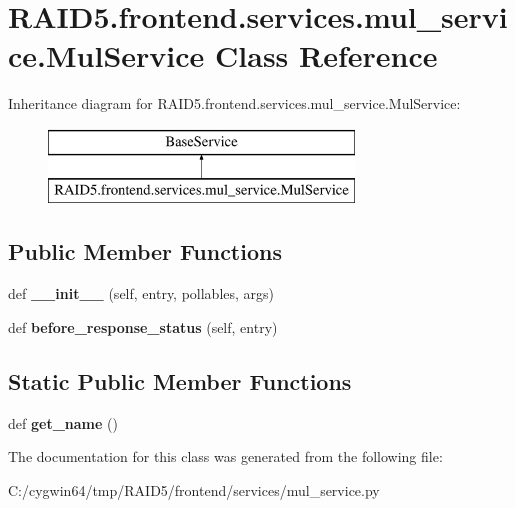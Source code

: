 \hypertarget{class_r_a_i_d5_1_1frontend_1_1services_1_1mul__service_1_1_mul_service}{}\section{R\+A\+I\+D5.\+frontend.\+services.\+mul\+\_\+service.\+Mul\+Service Class Reference}
\label{class_r_a_i_d5_1_1frontend_1_1services_1_1mul__service_1_1_mul_service}
Inheritance diagram for R\+A\+I\+D5.\+frontend.\+services.\+mul\+\_\+service.\+Mul\+Service\+:\begin{figure}[H]
\begin{center}
\leavevmode
\includegraphics[height=2.000000cm]{class_r_a_i_d5_1_1frontend_1_1services_1_1mul__service_1_1_mul_service}
\end{center}
\end{figure}
\subsection*{Public Member Functions}
\begin{DoxyCompactItemize}
\item 
\mbox{\label{class_r_a_i_d5_1_1frontend_1_1services_1_1mul__service_1_1_mul_service_a33fae624e124be5282402ad1d59314c4}} 
def {\bfseries \+\_\+\+\_\+init\+\_\+\+\_\+} (self, entry, pollables, args)
\item 
\mbox{\label{class_r_a_i_d5_1_1frontend_1_1services_1_1mul__service_1_1_mul_service_ab52fdcb7a31a197e56e4786366dec465}} 
def {\bfseries before\+\_\+response\+\_\+status} (self, entry)
\end{DoxyCompactItemize}
\subsection*{Static Public Member Functions}
\begin{DoxyCompactItemize}
\item 
\mbox{\label{class_r_a_i_d5_1_1frontend_1_1services_1_1mul__service_1_1_mul_service_af0746d143f29e41f6e872eb63fd3e0eb}} 
def {\bfseries get\+\_\+name} ()
\end{DoxyCompactItemize}


The documentation for this class was generated from the following file\+:\begin{DoxyCompactItemize}
\item 
C\+:/cygwin64/tmp/\+R\+A\+I\+D5/frontend/services/mul\+\_\+service.\+py\end{DoxyCompactItemize}
